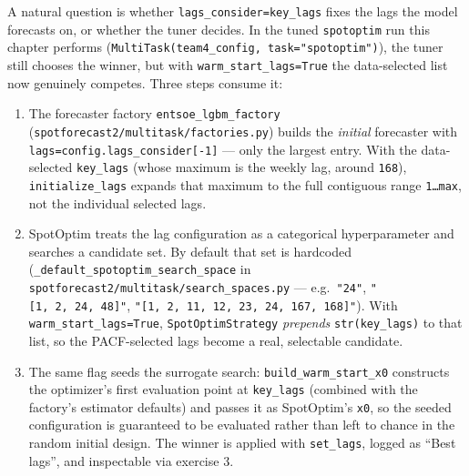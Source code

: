 \documentclass[
  english,
  letterpaper,
]{scrbook}
\providecommand{\tightlist}{%
  \setlength{\itemsep}{0pt}\setlength{\parskip}{0pt}}
\begin{document}
\begin{tcolorbox}[enhanced jigsaw, arc=.35mm, bottomrule=.15mm, bottomtitle=1mm, breakable, colback=white, colbacktitle=quarto-callout-note-color!10!white, colframe=quarto-callout-note-color-frame, coltitle=black, left=2mm, leftrule=.75mm, opacityback=0, opacitybacktitle=0.6, rightrule=.15mm, title=\textcolor{quarto-callout-note-color}{\faInfo}\hspace{0.5em}{Where \texttt{key\_lags} is used --- and who really picks the lags}, titlerule=0mm, toprule=.15mm, toptitle=1mm]

A natural question is whether \texttt{lags\_consider=key\_lags} fixes
the lags the model forecasts on, or whether the tuner decides. In the
tuned \texttt{spotoptim} run this chapter performs
(\texttt{MultiTask(team4\_config,\ task="spotoptim")}), the tuner still
chooses the winner, but with \texttt{warm\_start\_lags=True} the
data-selected list now genuinely competes. Three steps consume it:

\begin{enumerate}
\def\labelenumi{\arabic{enumi}.}
\tightlist
\item
  The forecaster factory \texttt{entsoe\_lgbm\_factory}
  (\texttt{spotforecast2/multitask/factories.py}) builds the
  \emph{initial} forecaster with
  \texttt{lags=config.lags\_consider{[}-1{]}} --- only the largest
  entry. With the data-selected \texttt{key\_lags} (whose maximum is the
  weekly lag, around \texttt{168}), \texttt{initialize\_lags} expands
  that maximum to the full contiguous range \texttt{1…max}, not the
  individual selected lags.
\item
  SpotOptim treats the lag configuration as a categorical hyperparameter
  and searches a candidate set. By default that set is hardcoded
  (\texttt{\_default\_spotoptim\_search\_space} in
  \texttt{spotforecast2/multitask/search\_spaces.py} ---
  e.g.~\texttt{"24"}, \texttt{"{[}1,\ 2,\ 24,\ 48{]}"},
  \texttt{"{[}1,\ 2,\ 11,\ 12,\ 23,\ 24,\ 167,\ 168{]}"}). With
  \texttt{warm\_start\_lags=True}, \texttt{SpotOptimStrategy}
  \emph{prepends} \texttt{str(key\_lags)} to that list, so the
  PACF-selected lags become a real, selectable candidate.
\item
  The same flag seeds the surrogate search:
  \texttt{build\_warm\_start\_x0} constructs the optimizer's first
  evaluation point at \texttt{key\_lags} (combined with the factory's
  estimator defaults) and passes it as SpotOptim's \texttt{x0}, so the
  seeded configuration is guaranteed to be evaluated rather than left to
  chance in the random initial design. The winner is applied with
  \texttt{set\_lags}, logged as ``Best lags'', and inspectable via
  exercise 3.
\end{enumerate}


\end{tcolorbox}
\end{document}
